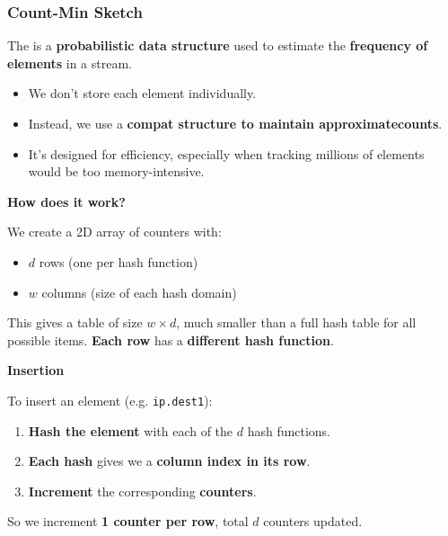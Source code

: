 \subsubsection{Count-Min Sketch}

The  is a \textbf{probabilistic data structure} used to estimate the \textbf{frequency of elements} in a stream.
\begin{itemize}
    \item We don't store each element individually.
    \item Instead, we use a \textbf{compat structure to maintain approximate\break counts}.
    \item It's designed for efficiency, especially when tracking millions of elements would be too memory-intensive.
\end{itemize}

\highspace
\begin{flushleft}
    \textcolor{Green3}{ \textbf{How does it work?}}
\end{flushleft}
We create a 2D array of counters with:
\begin{itemize}
    \item $d$ rows (one per hash function)
    \item $w$ columns (size of each hash domain)
\end{itemize}
This gives a table of size $w \times d$, much smaller than a full hash table for all possible items. \textbf{Each row} has a \textbf{different hash function}.

\highspace
\begin{flushleft}
    \textcolor{Green3}{ \textbf{Insertion}}
\end{flushleft}
To insert an element (e.g. \texttt{ip.dest1}):
\begin{enumerate}
    \item \textbf{Hash the element} with each of the $d$ hash functions.
    \item \textbf{Each hash} gives we a \textbf{column index in its row}.
    \item \textbf{Increment} the corresponding \textbf{counters}.
\end{enumerate}
So we increment \textbf{1 counter per row}, total $d$ counters updated.

